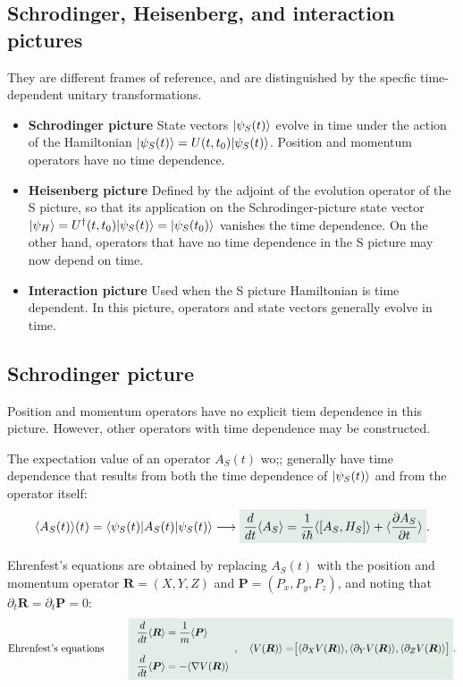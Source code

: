 \subsection{Schrodinger, Heisenberg, and interaction pictures}
They are different frames of reference, and are distinguished by the specfic time-dependent unitary transformations.
\begin{itemize}[itemsep=0pt,topsep=0pt]
    \item\textbf{Schrodinger picture} State vectors $|\psi_S(t)\rangle$ evolve in time under the action of the Hamiltonian $|\psi_S(t)\rangle=U(t,t_0)|\psi_S(t)\rangle$. Position and momentum operators have no time dependence.
    \item\textbf{Heisenberg picture} Defined by the adjoint of the evolution operator of the S picture, so that its application on the Schrodinger-picture state vector $|\psi_H\rangle=U^\dagger(t,t_0)|\psi_S(t)\rangle=|\psi_S(t_0)\rangle$ 
    vanishes the time dependence. On the other hand, operators that have no time dependence in the S picture may now depend on time.
    \item\textbf{Interaction picture} Used when the S picture Hamiltonian is time dependent. In this picture, operators and state vectors generally evolve in time.
\end{itemize}
\subsection{Schrodinger picture}
Position and momentum operators have no explicit tiem dependence in this picture. However, other operators with time dependence may be constructed.

The expectation value of an operator $A_S(t)$ wo;; generally have time dependence that results from both the time dependence of $|\psi_S(t)\rangle$ and from the operator itself:
\begin{align}
    \braket{A_S(t)}(t)=\braket{\psi_S(t)|A_S(t)|\psi_S(t)}\longrightarrow\highlight{\frac{d}{dt}\braket{A_S}=\frac{1}{i\hbar}\braket{[A_S,H_S]}+\braket{\frac{\partial A_S}{\partial t}}}.
\end{align}

Ehrenfest's equations are obtained by replacing $A_S(t)$ with the position and momentum operator $\bm{R}=(X,Y,Z)$ and $\bm{P}=(P_x,P_y,P_z)$, and noting that $\partial_t\bm{R}=\partial_t\bm{P}=0$:
\begin{align}
    \text{Ehrenfest's equations }\qquad\highlight{\begin{array}{l}
        \dfrac{d}{dt}\braket{\bm{R}}=\dfrac{1}{m}\braket{\bm{P}}\\\\
        \dfrac{d}{dt}\braket{\bm{P}}=-\braket{\nabla V(\bm{R})}
    \end{array},\quad\braket{V(\bm{R})}=\bigr[\braket{\partial_XV(\bm{R})},\braket{\partial_YV(\bm{R})},\braket{\partial_ZV(\bm{R})}\bigr]}.
\end{align}
